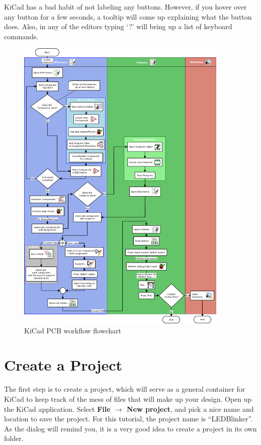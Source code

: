 \documentclass[12pt, oneside]{article}
\begin{document}
KiCad has a bad habit of not labeling any buttons. However, if you hover over any button for a few seconds, a tooltip will come up explaining what the button does. Also, in any of the editors typing `?' will bring up a list of keyboard commands.

\begin{figure}[H]
\includegraphics[width=0.9\textwidth]{kicad_flowchart}
\centering
\caption{KiCad PCB workflow flowchart}
\end{figure}

\section{Create a Project}
The first step is to create a project, which will serve as a general container for KiCad to keep track of the mess of files that will make up your design. Open up the KiCad application. Select \textbf{File $\rightarrow$ New project}, and pick a nice name and location to save the project. For this tutorial, the project name is ``LEDBlinker''. As the dialog will remind you, it is a very good idea to create a project in its own folder. 
\end{document}
